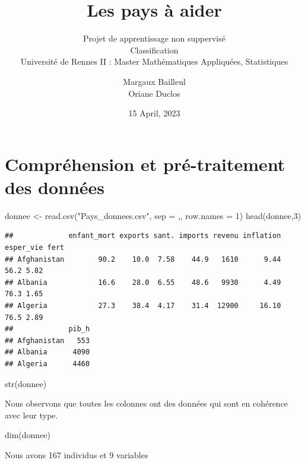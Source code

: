 \documentclass[
]{article}
\title{Les pays à aider}
\subtitle{Projet de apprentissage non suppervisé\\
Classification\\
Université de Rennes II : Master Mathématiques Appliquées, Statistiques}
\author{Margaux Bailleul\\
Oriane Duclos}
\date{15 April, 2023}
\newenvironment{Shaded}{}{}
\newcommand{\AttributeTok}[1]{#1}
\newcommand{\DecValTok}[1]{#1}
\newcommand{\FunctionTok}[1]{#1}
\newcommand{\NormalTok}[1]{#1}
\newcommand{\OtherTok}[1]{\textcolor[rgb]{1.00,0.25,0.00}{#1}}
\newcommand{\StringTok}[1]{\textcolor[rgb]{0.00,0.50,0.50}{#1}}
\begin{document}
\maketitle

{
\setcounter{tocdepth}{2}
\tableofcontents
}
\hypertarget{compruxe9hension-et-pruxe9-traitement-des-donnuxe9es}{%
\section{Compréhension et pré-traitement des
données}\label{compruxe9hension-et-pruxe9-traitement-des-donnuxe9es}}

\begin{Shaded}
\begin{Highlighting}[]
\NormalTok{donnee }\OtherTok{\textless{}{-}} \FunctionTok{read.csv}\NormalTok{(}\StringTok{"Pays\_donnees.csv"}\NormalTok{, }\AttributeTok{sep =} \StringTok{\textquotesingle{},\textquotesingle{}}\NormalTok{, }\AttributeTok{row.names =} \DecValTok{1}\NormalTok{)}
\FunctionTok{head}\NormalTok{(donnee,}\DecValTok{3}\NormalTok{)}
\end{Highlighting}
\end{Shaded}

\begin{verbatim}
##             enfant_mort exports sant. imports revenu inflation esper_vie fert
## Afghanistan        90.2    10.0  7.58    44.9   1610      9.44      56.2 5.82
## Albania            16.6    28.0  6.55    48.6   9930      4.49      76.3 1.65
## Algeria            27.3    38.4  4.17    31.4  12900     16.10      76.5 2.89
##             pib_h
## Afghanistan   553
## Albania      4090
## Algeria      4460
\end{verbatim}

\begin{Shaded}
\begin{Highlighting}[]
\FunctionTok{str}\NormalTok{(donnee)}
\end{Highlighting}
\end{Shaded}

Nous observons que toutes les colonnes ont des données qui sont en
cohérence avec leur type.

\begin{Shaded}
\begin{Highlighting}[]
\FunctionTok{dim}\NormalTok{(donnee)}
\end{Highlighting}
\end{Shaded}

Nous avons 167 individus et 9 variables
\end{document}
